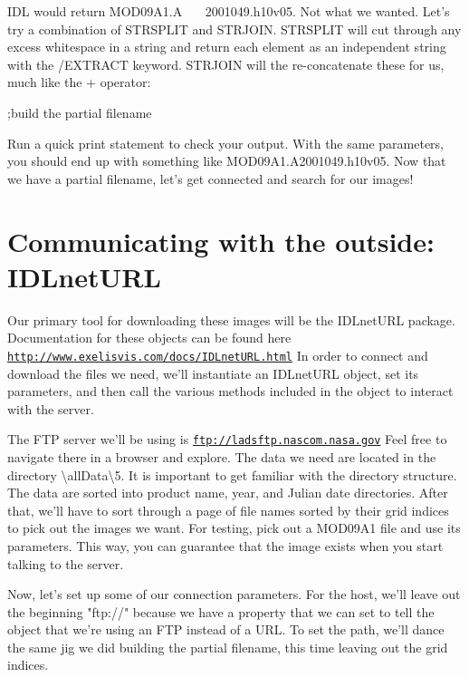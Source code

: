 \documentclass{book}
\newcounter{highlight}[page]
\newcommand{\tikzhighlightanchor}[1]{\ensuremath{\vcenter{\hbox{\tikz[remember picture, overlay]{\coordinate (#1 highlight \arabic{highlight});}}}}}
\newcommand{\bh}[0]{\stepcounter{highlight}\tikzhighlightanchor{begin}}
\newcommand{\eh}[0]{\tikzhighlightanchor{end}}
\theoremstyle{aside_style}
\newcommand{\link}[1]{\href{#1}{\nolinkurl{#1}}} %
\begin{document}
IDL would return MOD09A1.A \ \ \   2001049.h10v05. Not what we wanted. Let's try a combination of STRSPLIT and STRJOIN.
STRSPLIT will cut through any excess whitespace in a string and return each element as an independent string with the /EXTRACT keyword.
STRJOIN will the re-concatenate these for us, much like the + operator:

\begin{idl}
;build the partial filename
\end{idl}

Run a quick print statement to check your output.
With the same parameters, you should end up with something like MOD09A1.A2001049.h10v05.
Now that we have a partial filename, let's get connected and search for our images!


\section{Communicating with the outside: IDLnetURL}

Our primary tool for downloading these images will be the IDLnetURL package.
Documentation for these objects can be found here \link{http://www.exelisvis.com/docs/IDLnetURL.html}
In order to connect and download the files we need, we'll instantiate an IDLnetURL object, set its parameters, 
and then call the various methods included in the object to interact with the server. 

The FTP server we'll be using is \link{ftp://ladsftp.nascom.nasa.gov} Feel free to navigate there in a browser and explore.
The data we need are located in the directory \textbackslash allData\textbackslash 5.
It is important to get familiar with the directory structure. The data are sorted into product name, year, and Julian date directories.
After that, we'll have to sort through a page of file names sorted by their grid indices to pick out the images we want.
For testing, pick out a MOD09A1 file and use its parameters. This way, you can guarantee that the image exists when you start talking to the server.

Now, let's set up some of our connection parameters. 
For the host, we'll leave out the beginning "ftp://" because we have a property that we can set to tell the object that we're using an FTP instead of a URL.
To set the path, we'll dance the same jig we did building the partial filename, this time leaving out the grid indices.
\end{document}
